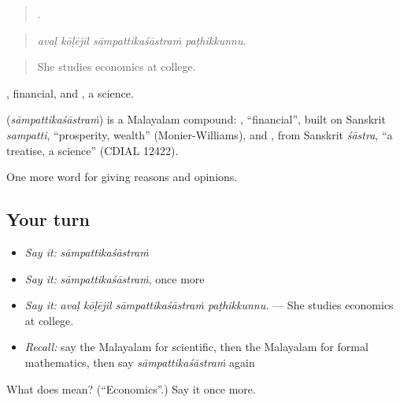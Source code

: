 \begin{quote}
   .
\end{quote}

\begin{quote}
\emph{avaḷ kōḷējil sāmpattikaśāstraṁ paṭhikkunnu.}
\end{quote}

\begin{quote}
She studies economics at college.
\end{quote}

, financial, and , a science.

\begin{cousinweb}
\textbf{} (\emph{sāmpattikaśāstraṁ}) is a Malayalam compound: , \textquotedblleft{}financial\textquotedblright{}, built on Sanskrit \emph{sampatti}, \textquotedblleft{}prosperity, wealth\textquotedblright{} (Monier-Williams), and , from Sanskrit \emph{śāstra}, \textquotedblleft{}a treatise, a science\textquotedblright{} (CDIAL 12422).
\end{cousinweb}

\begin{grammarlens}[title={What you've built}]
One more word for giving reasons and opinions.
\end{grammarlens}

\subsection*{Your turn}
\begin{itemize}
\raggedright
  \item \emph{Say it:} \emph{sāmpattikaśāstraṁ}
  \item \emph{Say it:} \emph{sāmpattikaśāstraṁ}, once more
  \item \emph{Say it:} \emph{avaḷ kōḷējil sāmpattikaśāstraṁ paṭhikkunnu.} — She studies economics at college.
  \item \emph{Recall:} say the Malayalam for scientific, then the Malayalam for formal mathematics, then say \emph{sāmpattikaśāstraṁ} again
\end{itemize}

\begin{tcolorbox}[breakable,colback=teal!4,colframe=teal!35!black,title={Before you move on}]
What does  mean? (\textquotedblleft{}Economics\textquotedblright{}.) Say it once more.
\end{tcolorbox}

